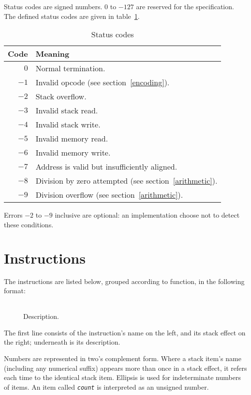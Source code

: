 \documentclass[a4paper]{article}
\newcommand{\spic}[1]{\texttt{\slshape{#1\/}}}
\newlength{\itemwidth}\itemwidth=\textwidth \advance\itemwidth by -0.1in
\newlength{\instname}\instname=0.8in
\newlength{\stackcom}\stackcom=3.7in
\newcommand{\instprim}[3]{\item[]\parbox{\itemwidth}%
{\makebox[\instname][l]{\tt #1}%
\makebox[\stackcom][r]{\spic{\pbox[t]{\stackcom}{#2}}}\\[0.5ex]#3}}
\newcommand{\inst}[4]{\instprim{#1}{\tt …#2 → …#3}{#4}}
\begin{document}
Status codes are signed numbers. $0$ to $-127$ are reserved for the specification. The defined status codes are given in table~\ref{statustable}.

\begin{table}[htb]
\begin{center}
\begin{tabular}{rp{4in}} \toprule
\bf Code & \bf Meaning \\ \midrule
$0$ & Normal termination. \\
$-1$ & Invalid opcode (see section~\ref{encoding}). \\
$-2$ & Stack overflow. \\
$-3$ & Invalid stack read. \\
$-4$ & Invalid stack write. \\
$-5$ & Invalid memory read. \\
$-6$ & Invalid memory write. \\
$-7$ & Address is valid but insufficiently aligned. \\
$-8$ & Division by zero attempted (see section~\ref{arithmetic}). \\
$-9$ & Division overflow (see section~\ref{arithmetic}). \\
 \bottomrule
\end{tabular}
\caption{\label{statustable}Status codes}
\end{center}
\end{table}

\noindent Errors $-2$ to $-9$ inclusive are optional: an implementation choose not to detect these conditions.


\section{Instructions}

The instructions are listed below, grouped according to function, in the following format:

\begin{description}
\inst{NAME}{before}{after}{Description.}
\end{description}

\noindent The first line consists of the instruction’s name on the left, and its stack effect on the right; underneath is its description.

Numbers are represented in two’s complement form. Where a stack item’s name (including any numerical suffix) appears more than once in a stack effect, it refers each time to the identical stack item. Ellipsis is used for indeterminate numbers of items. An item called \spic{count} is interpreted as an unsigned number.
\end{document}
